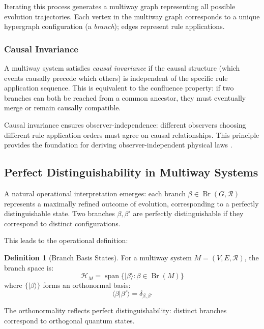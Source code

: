 \documentclass[11pt,a4paper]{article}
\theoremstyle{definition}
\newtheorem{definition}[theorem]{Definition}
\theoremstyle{remark}
\DeclareMathOperator{\spn}{span}
\DeclareMathOperator{\Br}{Br}
\newcommand{\Hilb}{\mathcal{H}}
\newcommand{\ket}[1]{|#1\rangle}
\newcommand{\braket}[2]{\langle#1|#2\rangle}
\begin{document}
Iterating this process generates a multiway graph representing all possible evolution trajectories. Each vertex in the multiway graph corresponds to a unique hypergraph configuration (a \textit{branch}); edges represent rule applications.

\subsubsection{Causal Invariance}

A multiway system satisfies \textit{causal invariance} if the causal structure (which events causally precede which others) is independent of the specific rule application sequence. This is equivalent to the confluence property: if two branches can both be reached from a common ancestor, they must eventually merge or remain causally compatible.

Causal invariance ensures observer-independence: different observers choosing different rule application orders must agree on causal relationships. This principle provides the foundation for deriving observer-independent physical laws \cite{gorard2020some}.

\subsection{Perfect Distinguishability in Multiway Systems}

A natural operational interpretation emerges: each branch $\beta \in \Br(G, \mathcal{R})$ represents a maximally refined outcome of evolution, corresponding to a perfectly distinguishable state. Two branches $\beta, \beta'$ are perfectly distinguishable if they correspond to distinct configurations.

This leads to the operational definition:
\begin{definition}[Branch Basis States]
\label{def:branch_basis}
For a multiway system $M = (V, E, \mathcal{R})$, the branch space is:
\begin{equation}
\Hilb_M = \spn\{\ket{\beta} : \beta \in \Br(M)\}
\end{equation}
where $\{\ket{\beta}\}$ forms an orthonormal basis:
\begin{equation}
\braket{\beta}{\beta'} = \delta_{\beta,\beta'}
\end{equation}
\end{definition}

The orthonormality reflects perfect distinguishability: distinct branches correspond to orthogonal quantum states.
\end{document}
